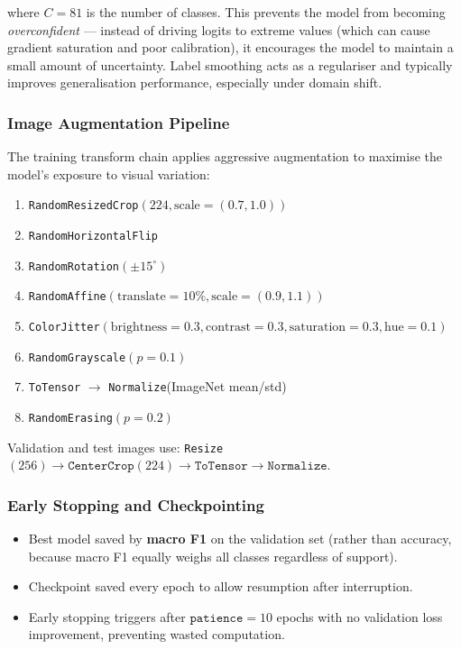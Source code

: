 \documentclass[12pt, a4paper]{article}
\begin{document}
where $C = 81$ is the number of classes.  This prevents the model from becoming
\emph{overconfident} --- instead of driving logits to extreme values (which can
cause gradient saturation and poor calibration), it encourages the model to
maintain a small amount of uncertainty.  Label smoothing acts as a regulariser
and typically improves generalisation performance, especially under domain shift.

\subsubsection{Image Augmentation Pipeline}

The training transform chain applies aggressive augmentation to maximise
the model's exposure to visual variation:

\begin{enumerate}[leftmargin=*]
    \item \texttt{RandomResizedCrop}$(224, \text{scale}=(0.7, 1.0))$
    \item \texttt{RandomHorizontalFlip}
    \item \texttt{RandomRotation}$(\pm 15^{\circ})$
    \item \texttt{RandomAffine}$(\text{translate}=10\%, \text{scale}=(0.9, 1.1))$
    \item \texttt{ColorJitter}$(\text{brightness}=0.3, \text{contrast}=0.3,
          \text{saturation}=0.3, \text{hue}=0.1)$
    \item \texttt{RandomGrayscale}$(p=0.1)$
    \item \texttt{ToTensor} $\to$ \texttt{Normalize}(ImageNet mean/std)
    \item \texttt{RandomErasing}$(p=0.2)$
\end{enumerate}

Validation and test images use: \texttt{Resize}$(256) \to
\texttt{CenterCrop}(224) \to \texttt{ToTensor} \to \texttt{Normalize}$.

\subsubsection{Early Stopping and Checkpointing}

\begin{itemize}[leftmargin=*]
    \item Best model saved by \textbf{macro F1} on the validation set (rather
          than accuracy, because macro F1 equally weighs all classes regardless
          of support).
    \item Checkpoint saved every epoch to allow resumption after interruption.
    \item Early stopping triggers after $\texttt{patience} = 10$ epochs with no
          validation loss improvement, preventing wasted computation.
\end{itemize}
\end{document}
